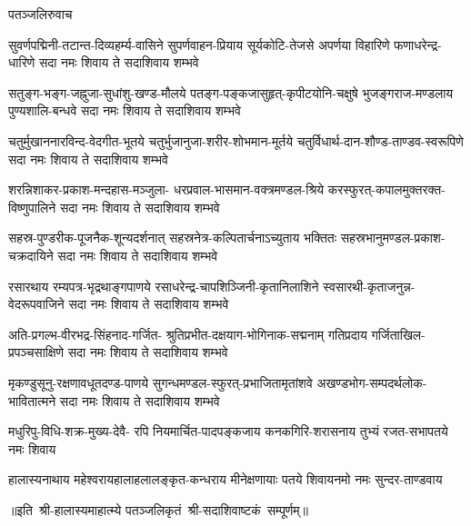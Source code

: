 
\centerline{पतञ्जलिरुवाच}
\fourlineindentedshloka
{सुवर्णपद्मिनी-तटान्त-दिव्यहर्म्य-वासिने}
{सुपर्णवाहन-प्रियाय सूर्यकोटि-तेजसे}
{अपर्णया विहारिणे फणाधरेन्द्र-धारिणे}
{सदा नमः शिवाय ते सदाशिवाय शम्भवे}

\fourlineindentedshloka
{सतुङ्ग-भङ्ग-जह्नुजा-सुधांशु-खण्ड-मौलये}
{पतङ्ग-पङ्कजासुहृत्-कृपीटयोनि-चक्षुषे}
{भुजङ्गराज-मण्डलाय पुण्यशालि-बन्धवे}
{सदा नमः शिवाय ते सदाशिवाय शम्भवे}

\fourlineindentedshloka
{चतुर्मुखाननारविन्द-वेदगीत-भूतये}
{चतुर्भुजानुजा-शरीर-शोभमान-मूर्तये}
{चतुर्विधार्थ-दान-शौण्ड-ताण्डव-स्वरूपिणे}
{सदा नमः शिवाय ते सदाशिवाय शम्भवे}

\fourlineindentedshloka
{शरन्निशाकर-प्रकाश-मन्दहास-मञ्जुला-}
{धरप्रवाल-भासमान-वक्त्रमण्डल-श्रिये}
{करस्फुरत्-कपालमुक्तरक्त-विष्णुपालिने}
{सदा नमः शिवाय ते सदाशिवाय शम्भवे}

\fourlineindentedshloka
{सहस्र-पुण्डरीक-पूजनैक-शून्यदर्शनात्}
{सहस्रनेत्र-कल्पितार्चनाऽच्युताय भक्तितः}
{सहस्रभानुमण्डल-प्रकाश-चक्रदायिने}
{सदा नमः शिवाय ते सदाशिवाय शम्भवे}

\fourlineindentedshloka
{रसारथाय रम्यपत्र-भृद्रथाङ्गपाणये}
{रसाधरेन्द्र-चापशिञ्जिनी-कृतानिलाशिने}
{स्वसारथी-कृताजनुन्न-वेदरूपवाजिने}
{सदा नमः शिवाय ते सदाशिवाय शम्भवे}

\fourlineindentedshloka
{अति-प्रगल्भ-वीरभद्र-सिंहनाद-गर्जित-}
{श्रुतिप्रभीत-दक्षयाग-भोगिनाक-सद्मनाम्}
{गतिप्रदाय गर्जिताखिल-प्रपञ्चसाक्षिणे}
{सदा नमः शिवाय ते सदाशिवाय शम्भवे}

\fourlineindentedshloka
{मृकण्डुसूनु-रक्षणावधूतदण्ड-पाणये}
{सुगन्धमण्डल-स्फुरत्-प्रभाजितामृतांशवे}
{अखण्डभोग-सम्पदर्थलोक-भावितात्मने}
{सदा नमः शिवाय ते सदाशिवाय शम्भवे}

\fourlineindentedshloka
{मधुरिपु-विधि-शक्र-मुख्य-देवै-}
{रपि नियमार्चित-पादपङ्कजाय}
{कनकगिरि-शरासनाय तुभ्यं}
{रजत-सभापतये नमः शिवाय}

\fourlineindentedshloka
{हालास्यनाथाय महेश्वराय}{हालाहलालङ्कृत-कन्धराय}
{मीनेक्षणायाः पतये शिवाय}{नमो नमः सुन्दर-ताण्डवाय}

॥इति~श्री-हालास्यमाहात्म्ये पतञ्जलिकृतं~श्री-सदाशिवाष्टकं~सम्पूर्णम्॥